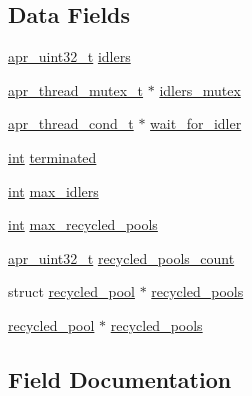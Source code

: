 \subsection*{Data Fields}
\begin{DoxyCompactItemize}
\item 
\hyperlink{group__apr__platform_ga558548a135d8a816c4787250744ea147}{apr\+\_\+uint32\+\_\+t} \hyperlink{structfd__queue__info__t_a34f88b2125fb629dd4200cf75568bb1d}{idlers}
\item 
\hyperlink{structapr__thread__mutex__t}{apr\+\_\+thread\+\_\+mutex\+\_\+t} $\ast$ \hyperlink{structfd__queue__info__t_a18d58b9d46ec7629daee1c309161b8d0}{idlers\+\_\+mutex}
\item 
\hyperlink{structapr__thread__cond__t}{apr\+\_\+thread\+\_\+cond\+\_\+t} $\ast$ \hyperlink{structfd__queue__info__t_ab55cf55999e66ef49df240ec7ac1b750}{wait\+\_\+for\+\_\+idler}
\item 
\hyperlink{pcre_8txt_a42dfa4ff673c82d8efe7144098fbc198}{int} \hyperlink{structfd__queue__info__t_ab3c2c38658e83a417f7d6d98ed021d87}{terminated}
\item 
\hyperlink{pcre_8txt_a42dfa4ff673c82d8efe7144098fbc198}{int} \hyperlink{structfd__queue__info__t_a288e8b082895e4560c6414d9b77b773d}{max\+\_\+idlers}
\item 
\hyperlink{pcre_8txt_a42dfa4ff673c82d8efe7144098fbc198}{int} \hyperlink{structfd__queue__info__t_ac83918a33f9efbcb3c79ca208358d5f3}{max\+\_\+recycled\+\_\+pools}
\item 
\hyperlink{group__apr__platform_ga558548a135d8a816c4787250744ea147}{apr\+\_\+uint32\+\_\+t} \hyperlink{structfd__queue__info__t_af10c530322499a45a7ceff4dee6047e0}{recycled\+\_\+pools\+\_\+count}
\item 
struct \hyperlink{structrecycled__pool}{recycled\+\_\+pool} $\ast$ \hyperlink{structfd__queue__info__t_ac4e7511417ba04c774bf0576cba54dc2}{recycled\+\_\+pools}
\item 
\hyperlink{structrecycled__pool}{recycled\+\_\+pool} $\ast$ \hyperlink{structfd__queue__info__t_aebbd6f5ba3644c41dc7502d26632a6e7}{recycled\+\_\+pools}
\end{DoxyCompactItemize}


\subsection{Field Documentation}
